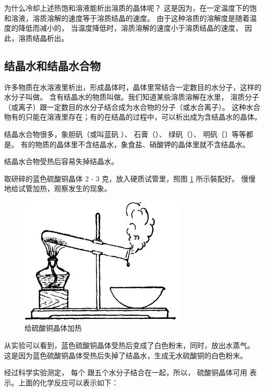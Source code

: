 为什么冷却上述热饱和溶液能析出溶质的晶体呢？
这是因为，在一定温度下的饱和溶液，溶质溶解的速度等于溶质结晶的速度。
由于这种溶质的溶解度是随着温度的降低而减小的，
当温度降低时，溶质溶解的速度小于溶质结晶的速度，
因此，溶质结晶析出。

\subsection{结晶水和结晶水合物}

许多物质在水溶液里析出，形成晶体时，晶体里常结合一定数目的水分子，这样的水分子叫做。
含有结晶水的物质叫做。我们知道某些溶质溶解在水里，
溶质分子（或离子）跟一定数目的水分子结合成为水合物的分子（或水合离子）。
这种水合物有的只能在溶液里存在；有的在结晶的过程中，可以析出成为含结晶水的晶体。

结晶水合物很多，象胆矾（或叫蓝矾 ）、
石膏（）、
绿矾（）、
明矾〔〕等等都是。
有的物质的晶体里不含结晶水，象食盐、硝酸钾的晶体里就不含结晶水。

结晶水合物受热后容易失掉结晶水。

\begin{shiyan}
    取研碎的蓝色硫酸铜晶体 2 - 3 克，放入硬质试管里，照图 \ref{fig:4-8} 所示裝配好。
    慢慢地给试管加热，观察发生的现象。
\end{shiyan}


\begin{figure}[htbp]
    \centering
    \includegraphics[width=8cm]{../pic/czhx1-ch4-8}
    \caption{给硫酸铜晶体加热}\label{fig:4-8}
\end{figure}



从实验可以看到，蓝色硫酸铜晶体受热后变成了白色粉末，同时，放出水蒸气。
这是因为蓝色硫酸铜晶体受热后失掉了结晶水，生成无水硫酸铜的白色粉末。

经过科学实验测定， 每个  跟五个水分子结合在一起，所以，
硫酸铜晶体可用  表示。上面的化学反应可以表示如下：
\begin{fangchengshi}
\end{fangchengshi}


